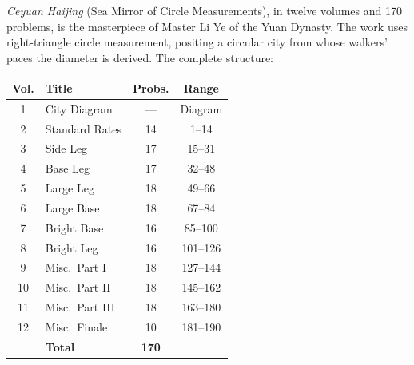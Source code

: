 \documentclass[9pt,a4paper]{article}
\begin{document}
\begin{minipage}[t]{0.50\textwidth}
\textit{Ceyuan Haijing} (Sea Mirror of Circle Measurements), in twelve volumes
and 170 problems, is the masterpiece of Master Li Ye of the Yuan Dynasty.
The work uses right-triangle circle measurement, positing a circular city
from whose walkers' paces the diameter is derived. The complete structure:

\vspace{0.2cm}
\begin{center}
\begin{tabular}{clcc}
\toprule
\textbf{Vol.} & \textbf{Title} & \textbf{Probs.} & \textbf{Range} \\
\midrule
1 & City Diagram & --- & Diagram \\
2 & Standard Rates & 14 & 1--14 \\
3 & Side Leg & 17 & 15--31 \\
\rowcolor{gray!15}
4 & Base Leg & 17 & 32--48 \\
\rowcolor{gray!15}
5 & Large Leg & 18 & 49--66 \\
\rowcolor{gray!15}
6 & Large Base & 18 & 67--84 \\
7 & Bright Base & 16 & 85--100 \\
8 & Bright Leg & 16 & 101--126 \\
9 & Misc.\ Part I & 18 & 127--144 \\
10 & Misc.\ Part II & 18 & 145--162 \\
11 & Misc.\ Part III & 18 & 163--180 \\
12 & Misc.\ Finale & 10 & 181--190 \\
\midrule
 & \textbf{Total} & \textbf{170} & \\
\bottomrule
\end{tabular}
\end{center}
\end{minipage}
\vspace{0.15cm}

\vspace{0.4cm}
\end{document}
